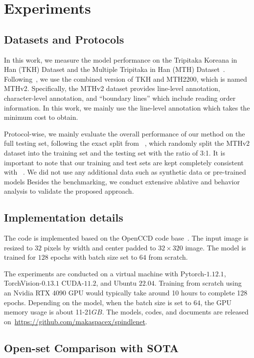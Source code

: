 
\section{Experiments}

\subsection{Datasets and Protocols}
In this work, we measure the model performance on the Tripitaka Koreana in Han (TKH) Dataset and the Multiple Tripitaka in Han (MTH) Dataset~\cite{tkhmth}. Following~\cite{jla},
we use the combined version of TKH and MTH2200, which is named MTHv2. Specifically, the MTHv2 dataset provides line-level annotation, character-level annotation, and ``boundary lines'' which include reading order information. In this work, we mainly use the line-level annotation which takes the minimum cost to obtain. 

Protocol-wise, we mainly evaluate the overall performance of our method on the full testing set, following the exact split from ~\cite{jla}, which randomly split the MTHv2 dataset into the training set and the testing set with the ratio of 3:1. It is important to note that our training and test sets are kept completely consistent with ~\cite{jla}. We did not use any additional data such as synthetic data or pre-trained models
Besides the benchmarking, we conduct extensive ablative and behavior analysis to validate the proposed approach.

\subsection{Implementation details}
The code is implemented based on the OpenCCD code base~\cite{vsdf}. The input image is resized to $32$ pixels by width and center padded to $32\times 320$ image. The model is trained for $128$ epochs with batch size set to $64$ from scratch.

The experiments are conducted on a virtual machine with Pytorch-$1.12.1$, TorchVision-$0.13.1$ CUDA-$11.2$, and Ubuntu $22.04$. Training from scratch using an Nvidia RTX 4090 GPU would typically take around 10 hours to complete 128 epochs. Depending on the model, when the batch size is set to $64$, the GPU memory usage is about 11-21$GB$. The models, codes, and documents are released on~\url{https://github.com/makaspacex/spindlenet}.

\subsection{Open-set Comparison with SOTA}

